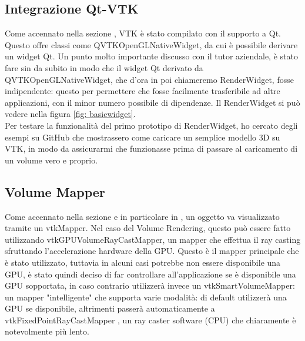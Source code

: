 \subsection{Integrazione Qt-VTK}
Come accennato nella sezione , VTK è stato compilato con il supporto a Qt. Questo offre classi come QVTKOpenGLNativeWidget, da cui è possibile derivare un widget Qt. Un punto molto importante discusso con il tutor aziendale, è stato fare sin da subito in modo che il widget Qt derivato da QVTKOpenGLNativeWidget, che d'ora in poi chiameremo RenderWidget, fosse indipendente: questo per permettere che fosse facilmente trasferibile ad altre applicazioni, con il minor numero possibile di dipendenze. Il RenderWidget si può vedere nella figura \ref{fig: basicwidget}.
\\
Per testare la funzionalità del primo prototipo di RenderWidget, ho cercato degli esempi su GitHub che mostrassero come caricare un semplice modello 3D su VTK, in modo da assicurarmi che funzionasse prima di passare al caricamento di un volume vero e proprio.

\subsection{Volume Mapper}
Come accennato nella sezione  e in particolare in , un oggetto va visualizzato tramite un vtkMapper. Nel caso del Volume Rendering, questo può essere fatto utilizzando vtkGPUVolumeRayCastMapper, un mapper che effettua il ray casting sfruttando l'accelerazione hardware della GPU. Questo è il mapper principale che è stato utilizzato, tuttavia in alcuni casi potrebbe non essere disponibile una GPU, è stato quindi deciso di far controllare all'applicazione se è disponibile una GPU sopportata, in caso contrario utilizzerà invece un vtkSmartVolumeMapper: un mapper "intelligente" che supporta varie modalità: di default utilizzerà una GPU se disponibile, altrimenti passerà automaticamente a vtkFixedPointRayCastMapper , un ray caster software (CPU) che chiaramente è notevolmente più lento.

